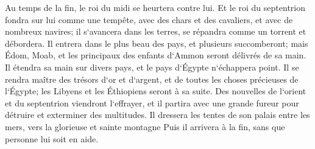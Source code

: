 \verse Au temps de la fin, le roi du midi se heurtera contre lui. Et le roi du septentrion fondra sur lui comme une tempête, avec des chars et des cavaliers, et avec de nombreux navires; il s`avancera dans les terres, se répandra comme un torrent et débordera. 
\verse Il entrera dans le plus beau des pays, et plusieurs succomberont; mais Édom, Moab, et les principaux des enfants d`Ammon seront délivrés de sa main. 
\verse Il étendra sa main sur divers pays, et le pays d`Égypte n`échappera point. 
\verse Il se rendra maître des trésors d`or et d`argent, et de toutes les choses précieuses de l`Égypte; les Libyens et les Éthiopiens seront à sa suite. 
\verse Des nouvelles de l`orient et du septentrion viendront l`effrayer, et il partira avec une grande fureur pour détruire et exterminer des multitudes. 
\verse Il dressera les tentes de son palais entre les mers, vers la glorieuse et sainte montagne Puis il arrivera à la fin, sans que personne lui soit en aide. 

\chapter{}

